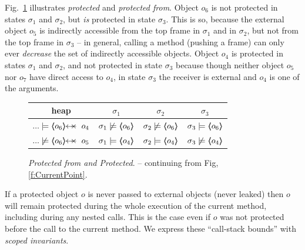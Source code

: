  
Fig.\ \ref{fig:ProtectedBoth} illustrates \emph{protected} and \emph{protected
from}. Object $o_6$ is not protected in states $\sigma_1$ and
$\sigma_2$, but \emph{is} protected in state $\sigma_3$.
This is so, because the external object $o_5$ is indirectly accessible from the top frame in $\sigma_1$ and in  $\sigma_2$, but not
from the top frame in $\sigma_3$ --
in general, calling a method (pushing a frame) can only ever \emph{decrease} the set of indirectly accessible objects. 
Object $o_4$  is  protected in  states $\sigma_1$ and  $\sigma_2$,  and not  protected in state $\sigma_3$
because though neither object $o_5$ nor $o_7$ have direct access to $o_4$, in state $\sigma_3$ the receiver is external and $o_4$ is one of the arguments.

 
\begin{figure}[htb]
\begin{tabular}{|c|c|c|c|}
\hline
 heap
&
$\sigma_1$  %
&
$\sigma_2$ 
&
$\sigma_3$ 
\\
\hline 
$... \models \protectedFrom {o_6} {o_4}$
&
$\sigma_1   \not\models \langle\!\!\langle o_6 \rangle\!\!\rangle$
&
$\sigma_2   \not\models \langle\!\!\langle o_6 \rangle\!\!\rangle$
&
$\sigma_3 \models \langle\!\!\langle o_6 \rangle\!\!\rangle$
\\
$... \not\models  \protectedFrom {o_6} {o_5}$
&
$\sigma_1  \models \langle\!\!\langle o_4 \rangle\!\!\rangle$
&
$\sigma_2 \models \langle\!\!\langle o_4 \rangle\!\!\rangle$
&
$\sigma_3 \not \models \langle\!\!\langle o_4 \rangle\!\!\rangle$
\\
\hline %
\end{tabular}
\caption{\textit{Protected from and Protected}. -- continuing from Fig, \ref{f:CurrentPoint}.
 }
   \label{fig:ProtectedBoth}
 \end{figure}

If a protected object $o$ is never passed to external objects (\ie never leaked)  then $o$ will remain protected during the whole execution of the current method,
including during any nested calls.
This is the case even if $o$ was not protected before the call to the current method.
We express these ``call-stack bounds'' with \emph{scoped invariants}.



